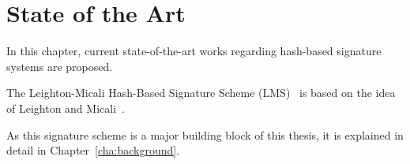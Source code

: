 \chapter{State of the Art}
\label{cha:stateOfTheArt}

In this chapter, current state-of-the-art works regarding hash-based signature systems are proposed.

The Leighton-Micali Hash-Based Signature Scheme (LMS)~\cite{LMS_RFC8554} is based on the idea of Leighton and Micali~\cite{LMS_patent_leighton1995}. 

As this signature scheme is a major building block of this thesis, it is explained in detail in Chapter~\ref{cha:background}. %




